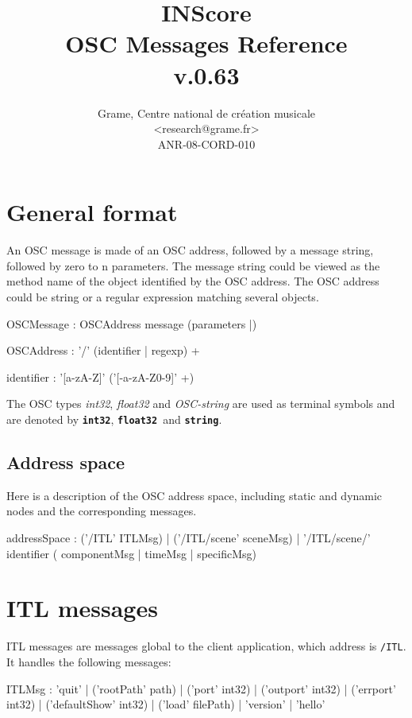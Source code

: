 \documentclass[a4paper,twoside]{report}
\newcommand{\toplevel}[1]	{\chapter{#1}}
\newcommand{\sublevel}[1]	{\section{#1}}
\newcommand{\OSC}[1]		{\texttt{#1}}
\newcommand{\osctype}[1]{\textbf{\texttt{{\small #1}}}}
\newcommand{\oscint}{\osctype{int32}}
\newcommand{\oscfloat}{\osctype{float32}}
\newcommand{\oscstring}{\osctype{string}}
\begin{document}
\title{INScore \\ OSC Messages Reference \\v.0.63}

\author{Grame, Centre national de cr\'eation musicale\\
{\small <research@grame.fr>} \\
\vspace{2mm}
ANR-08-CORD-010
}

\maketitle

\pagestyle{empty}
\cleardoublepage
\tableofcontents
\newpage
\pagestyle{plain}
\setcounter{page}{1}

\toplevel{General format}
\label{genformat}
An OSC message is made of an OSC address, followed by a message string, followed by zero to n parameters. The message string could be viewed as the method name of the object identified by the OSC address.
The OSC address could be string or a regular expression matching several objects.
\begin{rail}
OSCMessage : OSCAddress message (parameters |)
\end{rail}

\begin{rail}
OSCAddress : '/' (identifier | regexp) +
\end{rail}

\begin{rail}
identifier : '[a-zA-Z]' ('[-a-zA-Z0-9]' +)
\end{rail}

The OSC types \emph{int32}, \emph{float32} and \emph{OSC-string} are used as terminal symbols and are denoted by \oscint, \oscfloat\ and \oscstring. 

\sublevel{Address space}
Here is a description of the OSC address space, including static and dynamic nodes and the corresponding messages.
\begin{rail}
addressSpace : ('/ITL' ITLMsg) 
			| ('/ITL/scene' sceneMsg) 
			| '/ITL/scene/' identifier ( componentMsg | timeMsg | specificMsg)
\end{rail}


\toplevel{ITL messages}
\label{ITL}
ITL messages are messages global to the client application, which address is \OSC{/ITL}. It handles the following messages:
\begin{rail}
ITLMsg : 'quit' 
		| ('rootPath' path) 
		| ('port' int32)
		| ('outport' int32)
		| ('errport' int32)
		| ('defaultShow' int32)
		| ('load' filePath)
		| 'version'
		| 'hello'
\end{rail}
\end{document}
